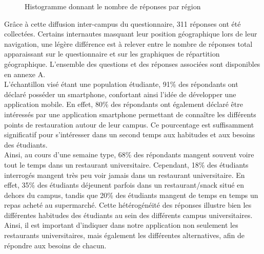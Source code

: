 \begin{figure}[H]
    \label{fig-histo-reponses}
    \noindent{}
    \caption{Histogramme donnant le nombre de réponses par région}
\end{figure}

Grâce à cette diffusion inter-campus du questionnaire, 311 réponses ont été collectées. Certains internautes masquant leur position géographique lors de leur navigation, une légère différence est à relever entre le nombre de réponses total apparaissant sur le questionnaire et sur les graphiques de répartition géographique. L'ensemble des questions et des réponses associées sont disponibles en annexe A. \\

L'échantillon visé étant une population étudiante, 91\% des répondants ont déclaré posséder un smartphone, confortant ainsi l'idée de développer une application mobile. En effet, 80\% des répondants ont également déclaré être intéressés par une application smartphone permettant de connaître les différents points de restauration autour de leur campus. Ce pourcentage est suffisamment significatif pour s'intéresser dans un second temps aux habitudes et aux besoins des étudiants. \\

Ainsi, au cours d'une semaine type, 68\% des répondants mangent souvent voire tout le temps dans un restaurant universitaire. Cependant, 18\% des étudiants interrogés mangent très peu voir jamais dans un restaurant universitaire. En effet, 35\% des étudiants déjeunent parfois dans un restaurant/snack situé en dehors du campus, tandis que 20\% des étudiants mangent de temps en temps un repas acheté au supermarché. Cette hétérogénéité des réponses illustre bien les différentes habitudes des étudiants au sein des différents campus universitaires. Ainsi, il est important d'indiquer dans notre application non seulement les restaurants universitaires, mais également les différentes alternatives, afin de répondre aux besoins de chacun. \\


